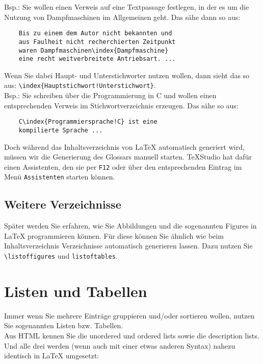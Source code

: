 Bsp.: Sie wollen einen Verweis auf eine Textpassage festlegen, in der es um die Nutzung von Dampfmaschinen im Allgemeinen geht. Das sähe dann so aus:

\begin{verbatim}
	Bis zu einem dem Autor nicht bekannten und 
	aus Faulheit nicht recherchierten Zeitpunkt 
	waren Dampfmaschinen\index{Dampfmaschine} 
	eine recht weitverbreitete Antriebsart. ...
\end{verbatim}

Wenn Sie dabei Haupt- und Unterstichworter nutzen wollen, dann sieht das so aus: \verb|\index{Hauptstichwort!Unterstichwort}|.\\

Bsp.: Sie schreiben über die Programmierung in C und wollen einen entsprechenden Verweis im Stichwortverzeichnis erzeugen. Das sähe so aus:

\begin{verbatim}
	C\index{Programmiersprache!C} ist eine 
	kompilierte Sprache ...
\end{verbatim}

Doch während das Inhaltsverzeichnis von LaTeX automatisch generiert wird, müssen wir die Generierung des Glossars manuell starten. TeXStudio hat dafür einen Assistenten, den sie per \verb|F12| oder über den entsprechenden Eintrag im Menü \verb|Assistenten| starten können.

\subsection{Weitere Verzeichnisse}

Später werden Sie erfahren, wie Sie Abbildungen und die sogenannten Figures in LaTeX programmieren können. Für diese können Sie ähnlich wie beim Inhaltsverzeichnis Verzeichnisse automatisch generieren lassen. Dazu nutzen Sie \verb|\listoffigures| und \verb|listoftables|.

\section{Listen und Tabellen}

Immer wenn Sie mehrere Einträge gruppieren und/oder sortieren wollen, nutzen Sie sogenannten Listen bzw. Tabellen.\\

Aus HTML kennen Sie die unordered und ordered lists sowie die description lists. Und alle drei werden (wenn auch mit einer etwas anderen Syntax) nahezu identisch in LaTeX umgesetzt:\\

